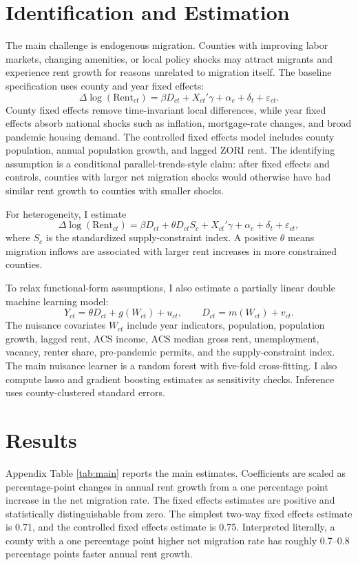 \documentclass[11pt]{article}
\begin{document}
\section{Identification and Estimation}

The main challenge is endogenous migration. Counties with improving labor markets, changing amenities, or local policy shocks may attract migrants and experience rent growth for reasons unrelated to migration itself. The baseline specification uses county and year fixed effects:
\[
\Delta \log(\text{Rent}_{ct}) =
\beta D_{ct} + X_{ct}'\gamma + \alpha_c + \delta_t + \varepsilon_{ct}.
\]
County fixed effects remove time-invariant local differences, while year fixed effects absorb national shocks such as inflation, mortgage-rate changes, and broad pandemic housing demand. The controlled fixed effects model includes county population, annual population growth, and lagged ZORI rent. The identifying assumption is a conditional parallel-trends-style claim: after fixed effects and controls, counties with larger net migration shocks would otherwise have had similar rent growth to counties with smaller shocks.

For heterogeneity, I estimate
\[
\Delta \log(\text{Rent}_{ct}) =
\beta D_{ct}+\theta D_{ct}S_c+X_{ct}'\gamma+\alpha_c+\delta_t+\varepsilon_{ct},
\]
where $S_c$ is the standardized supply-constraint index. A positive $\theta$ means migration inflows are associated with larger rent increases in more constrained counties.

To relax functional-form assumptions, I also estimate a partially linear double machine learning model:
\[
Y_{ct}=\theta D_{ct}+g(W_{ct})+u_{ct}, \qquad
D_{ct}=m(W_{ct})+v_{ct}.
\]
The nuisance covariates $W_{ct}$ include year indicators, population, population growth, lagged rent, ACS income, ACS median gross rent, unemployment, vacancy, renter share, pre-pandemic permits, and the supply-constraint index. The main nuisance learner is a random forest with five-fold cross-fitting. I also compute lasso and gradient boosting estimates as sensitivity checks. Inference uses county-clustered standard errors.

\section{Results}

Appendix Table \ref{tab:main} reports the main estimates. Coefficients are scaled as percentage-point changes in annual rent growth from a one percentage point increase in the net migration rate. The fixed effects estimates are positive and statistically distinguishable from zero. The simplest two-way fixed effects estimate is 0.71, and the controlled fixed effects estimate is 0.75. Interpreted literally, a county with a one percentage point higher net migration rate has roughly 0.7--0.8 percentage points faster annual rent growth.
\end{document}
